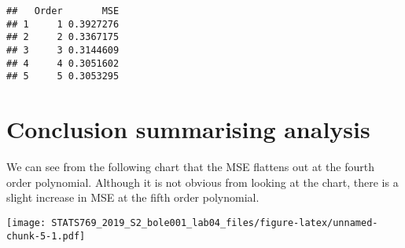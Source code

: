 \documentclass[]{article}
\newenvironment{Shaded}{\begin{snugshade}}{\end{snugshade}}
\newcommand{\KeywordTok}[1]{\textcolor[rgb]{0.13,0.29,0.53}{\textbf{#1}}}
\newcommand{\DataTypeTok}[1]{\textcolor[rgb]{0.13,0.29,0.53}{#1}}
\newcommand{\StringTok}[1]{\textcolor[rgb]{0.31,0.60,0.02}{#1}}
\newcommand{\OperatorTok}[1]{\textcolor[rgb]{0.81,0.36,0.00}{\textbf{#1}}}
\newcommand{\NormalTok}[1]{#1}
\begin{document}
\begin{verbatim}
##   Order       MSE
## 1     1 0.3927276
## 2     2 0.3367175
## 3     3 0.3144609
## 4     4 0.3051602
## 5     5 0.3053295
\end{verbatim}

\section{Conclusion summarising
analysis}\label{conclusion-summarising-analysis}

We can see from the following chart that the MSE flattens out at the
fourth order polynomial. Although it is not obvious from looking at the
chart, there is a slight increase in MSE at the fifth order polynomial.

\begin{Shaded}
\end{Shaded}

\texttt{[image: STATS769\_2019\_S2\_bole001\_lab04\_files/figure-latex/unnamed-chunk-5-1.pdf]}
\end{document}
